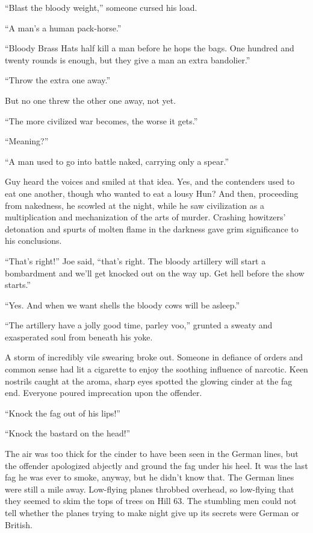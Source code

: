 ``Blast the bloody weight,'' someone cursed his load.

``A man's a human pack-horse.''

``Bloody Brass Hats half kill a man before he hops the bags. One hundred and twenty rounds is enough, but they give a man an extra bandolier.''

``Throw the extra one away.''

But no one threw the other one away, not yet.

``The more civilized war becomes, the worse it gets.''

``Meaning?''

``A man used to go into battle naked, carrying only a spear.''

Guy heard the voices and smiled at that idea. Yes, and the contenders used to eat one another, though who wanted to eat a lousy Hun? And then, proceeding from nakedness, he scowled at the night, while he saw civilization as a multiplication and mechanization of the arts of murder. Crashing howitzers' detonation and spurts of molten flame in the darkness gave grim significance to his conclusions.

``That's right!'' Joe said, ``that's right. The bloody artillery will start a bombardment and we'll get knocked out on the way up. Get hell before the show starts.''

``Yes. And when we want shells the bloody cows will be asleep.''

``The artillery have a jolly good time, parley voo,'' grunted a sweaty and exasperated soul from beneath his yoke.

A storm of incredibly vile swearing broke out. Someone in defiance of orders and common sense had lit a cigarette to enjoy the soothing influence of narcotic. Keen nostrils caught at the aroma, sharp eyes spotted the glowing cinder at the fag end. Everyone poured imprecation upon the offender.

``Knock the fag out of his lips!''

``Knock the bastard on the head!''

The air was too thick for the cinder to have been seen in the German lines, but the offender apologized abjectly and ground the fag under his heel. It was the last fag he was ever to smoke, anyway, but he didn't know that. The German lines were still a mile away. Low-flying planes throbbed overhead, so low-flying that they seemed to skim the tops of trees on Hill 63. The stumbling men could not tell whether the planes trying to make night give up its secrets were German or British.

